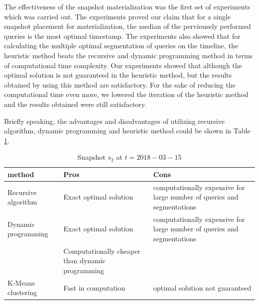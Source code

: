 			The effectiveness of the snapshot materialization was the first set of experiments which was carried out. The experiments proved our claim that for a single snapshot placement for materialization, the median of the perviousely performed queries is the most optimal timestamp. The experiments also showed that for calculating the multiple optimal segmentation of queries on the timeline, the heuristic method beats the recursive and dynamic programming method in terms of computational time complexity. Our experiments showed that although the optimal solution is not guaranteed in the heuristic method, but the results obtained by using this method are satisfactory. For the sake of reducing the computational time even more, we lowered the iteration of the heuristic method and the results obtained were still satisfactory.

			Briefly speaking, the advantages and disadvantages of utilizing recursive algorithm, dynamic programming and heuristic method could be shown in Table \ref{table:segmentation_comparison}. 
			\begin{center}
				\begin{table}
					\centering
					\small
					\caption{Snapshot $s_2$ at $t = 2018-03-15$}
					\label{table:segmentation_comparison}
					\begin{tabular}{p{4cm}p{4cm}p{4cm}}
						\hline
						method & Pros  & Cons  \\ \hline
						Recursive algorithm & Exact optimal solution & computationally expensive for large number of queries and segmentations   \\ \hline
						Dynamic programming & Exact optimal solution & computationally expensive for large number of queries and segmentations\\ 
						  & Computationally cheaper than dynamic programming &    \\ \hline
						K-Means clustering & Fast in computation & optimal solution not guaranteed \\ \hline
					\end{tabular}
				\end{table}
			\end{center}

			